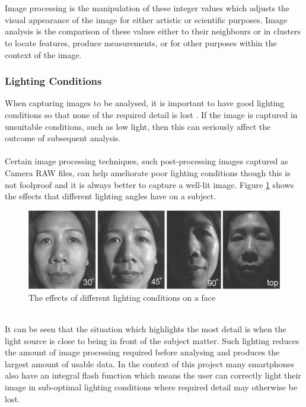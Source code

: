 		\\\\
		Image processing is the manipulation of these integer values which adjusts the visual appearance of the image for either artistic or scientific purposes. Image analysis is the comparison of these values either to their neighbours or in clusters to locate features, produce measurements, or for other purposes within the context of the image.
	\subsubsection{Lighting Conditions}
		When capturing images to be analysed, it is important to have good lighting conditions so that none of the required detail is lost \citep{introtoprocessing}. If the image is captured in unsuitable conditions, such as low light, then this can seriously affect the outcome of subsequent analysis. 
		\\\\
		Certain image processing techniques, such post-processing images captured as Camera RAW files, can help ameliorate poor lighting conditions though this is not foolproof and it is always better to capture a well-lit image. Figure \ref{fig:illumination} shows the effects that different lighting angles have on a subject.
		\begin{figure}[h!]
			\centering
			\includegraphics[width=\linewidth]{../images/face_illumination.png}
			\caption[]{The effects of different lighting conditions on a face \citep{introtoprocessing}}
			\label{fig:illumination}
		\end{figure}\\
		It can be seen that the situation which highlights the most detail is when the light source is close to being in front of the subject matter. Such lighting reduces the amount of image processing required before analysing and produces the largest amount of usable data. In the context of this project many smartphones also have an integral flash function which means the user can correctly light their image in sub-optimal lighting conditions where required detail may otherwise be lost.
